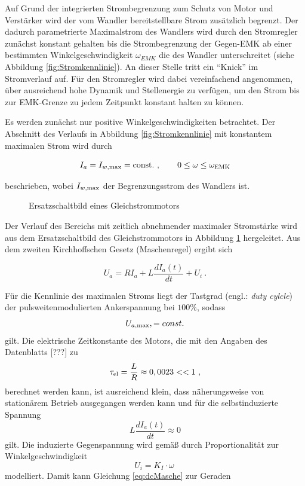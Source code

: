 Auf Grund der integrierten Strombegrenzung zum Schutz von Motor und Verstärker wird der vom Wandler bereitstellbare Strom zusätzlich begrenzt. Der dadurch parametrierte Maximalstrom des Wandlers wird durch den Stromregler zunächst konstant gehalten bis die Strombegrenzung der Gegen-EMK ab einer bestimmten Winkelgeschwindigkeit $\omega_{EMK}$ die des Wandler unterschreitet (siehe Abbildung \ref{fig:Stromkennlinie}). An dieser Stelle tritt ein "`Knick"' im Stromverlauf auf. Für den Stromregler wird dabei vereinfachend angenommen, über ausreichend hohe Dynamik und Stellenergie zu verfügen, um den Strom bis zur EMK-Grenze zu jedem Zeitpunkt konstant halten zu können.

Es werden zunächst nur positive Winkelgeschwindigkeiten betrachtet. 
Der Abschnitt des Verlaufs in Abbildung \ref{fig:Stromkennlinie} mit konstantem maximalen Strom wird durch

\begin{equation}
	I_a  = I_{w\mrm{, max}} = \mrm{const.} \ , \qquad 0 \leq \omega \leq \omega_{\mrm{EMK}}
	\label{eq:Iconst}
\end{equation}

beschrieben, wobei $I_{w\mathrm{, max}}$ der Begrenzungsstrom des Wandlers ist.

\begin{figure}[h]
	\centering
		
	\caption{Ersatzschaltbild eines Gleichstrommotors}
	\label{fig:dcESB}
\end{figure}

Der Verlauf des Bereichs mit zeitlich abnehmender maximaler Stromstärke wird aus dem Ersatzschaltbild des Gleichstrommotors in Abbildung \ref{fig:dcESB} hergeleitet. Aus dem zweiten Kirchhoffschen Gesetz (Maschenregel) ergibt sich

\begin{equation}
	U_a =  RI_a + L \frac{dI_a(t)}{dt} + U_i \ . 
	\label{eq:dcMasche}
\end{equation}

Für die Kennlinie des maximalen Stroms liegt der Tastgrad (engl.: \textit{duty cylcle}) der pulsweitenmodulierten Ankerspannung bei $100\%$, sodass 
\[
	U_{a \mathrm{, max}},  = const.
\]
gilt. Die elektrische Zeitkonstante des Motors, die mit den Angaben des Datenblatts [???] zu 
\[
	\tau_{\mathrm{el}} = \frac{L}{R} \approx 0,0023 << 1 \ ,
\]
berechnet werden kann, ist ausreichend klein, dass näherungsweise von stationärem Betrieb ausgegangen werden kann und für die selbstinduzierte Spannung 
\[
	L \frac{dI_a(t)}{dt} \approx 0
\]
gilt. Die induzierte Gegenspannung wird gemäß \cite{binder} durch Proportionalität zur Winkelgeschwindigkeit
\[
	U_i  = K_I \cdot \omega \ 
\]
modelliert.
Damit kann Gleichung \eqref{eq:dcMasche} zur Geraden

